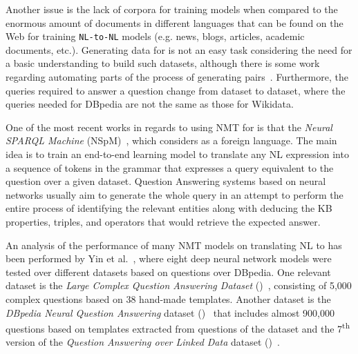 Another issue is the lack of corpora for training \NLtoSPARQL{} models when compared to 
the enormous amount of documents in different languages that can be found on the Web for 
training \texttt{NL-to-NL} models (e.g. news, blogs, articles, academic documents, etc.). Generating 
data for \NLtoSPARQL{} is not an easy task considering the need for a basic \SPARQL{} understanding 
to build such datasets, although there is some work regarding automating parts 
of the process of generating \NLtoSPARQL{} pairs~\cite{dataset:dbnqa-hartmann-marx-soru-2018, 
dataset:lcquad-TrivediMDL17}. Furthermore, the queries required to answer a question change from 
dataset to dataset, where the \SPARQL{} queries needed for DBpedia are not the same as those for Wikidata.

One of the most recent works in regards to using NMT for \SPARQL{} is that 
the \textit{Neural SPARQL Machine} (NSpM)~\cite{nmt:nspm-SoruMMPVEN17}, which considers \SPARQL{} as a foreign 
language. The main idea is to train an end-to-end learning model to translate any NL expression 
into a sequence of tokens in the \SPARQL{} grammar that expresses a query equivalent to the 
question over a given dataset. Question Answering systems based on neural networks usually 
aim to generate the whole \SPARQL{} query in an attempt to perform the entire process of 
identifying the relevant entities along with deducing the KB properties, triples, and operators 
that would retrieve the expected answer. 

An analysis of the performance of many NMT models on translating NL to \SPARQL{} 
has been performed by Yin et al.~\cite{nmt:nl-to-sparql-Yin19}, where eight deep neural network models 
were tested over different datasets based on questions over DBpedia. One relevant dataset is the 
\textit{Large Complex Question Answering Dataset} (\LCQuADone)~\cite{dataset:lcquad-TrivediMDL17}, 
consisting of 5,000 complex questions based on 38 hand-made templates. Another dataset is the 
\textit{DBpedia Neural Question Answering} dataset (\DBNQA)~\cite{dataset:dbnqa-hartmann-marx-soru-2018} 
that includes almost 900,000 questions based on templates extracted from questions of the \LCQuADone{} 
dataset and the 7\textsuperscript{th} version of the \textit{Question Answering over Linked Data} 
dataset (\QALDseven)~\cite{dataset:qald7-UsbeckNHKRN17}.

